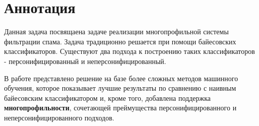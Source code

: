 \newpage
\section*{Аннотация}



Данная задача посвящаена задаче реализации многопрофильной системы фильтрации спама.
Задача традиционно решается при помощи байесовских классификаторов. Существуют два подхода к построению
таких классификаторов - персонифицированный и неперсонифицированный.

В работе представлено решение на базе более сложных методов машинного обучения, которое показывает
лучшие результаты по сравнению с наивным байесовским классификатором и, кроме того, добавлена поддержка
\textbf{многопрофильности}, сочетающей преймущества персонифицированного и неперсонифицированного подходов.

